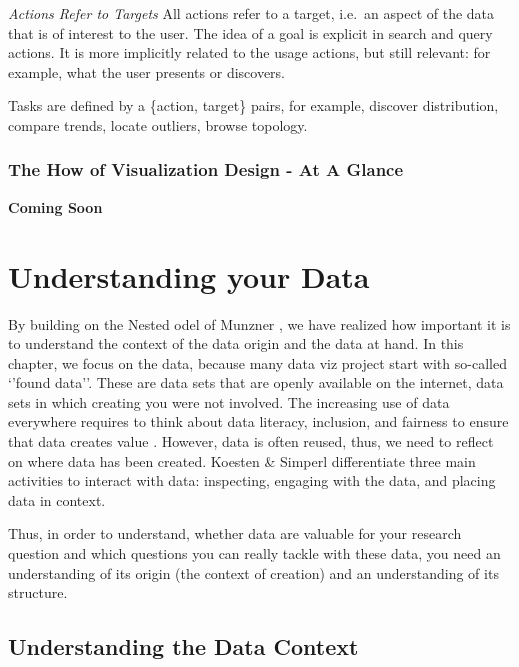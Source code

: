 \documentclass[
]{book}
\begin{document}
\emph{Actions Refer to Targets}
All actions refer to a target, i.e.~an aspect of the data that is of interest to the user. The idea of a goal is explicit in search and query actions. It is more implicitly related to the usage actions, but still relevant: for example, what the user presents or discovers.

Tasks are defined by a \{action, target\} pairs, for example, discover distribution, compare trends, locate outliers, browse topology.

\hypertarget{the-how-of-visualization-design---at-a-glance}{%
\subsection{The How of Visualization Design - At A Glance}\label{the-how-of-visualization-design---at-a-glance}}

\textbf{Coming Soon}

\hypertarget{sec:understandingdata}{%
\chapter{Understanding your Data}\label{sec:understandingdata}}

By building on the Nested odel of Munzner \citep{munzner2014visualization}, we have realized how important it is to understand the context of the data origin and the data at hand. In this chapter, we focus on the data, because many data viz project start with so-called `'found data''. These are data sets that are openly available on the internet, data sets in which creating you were not involved. The increasing use of data everywhere requires to think about data literacy, inclusion, and fairness to ensure that data creates value \citep{KoestenSimperl2021_dataUX}. However, data is often reused, thus, we need to reflect on where data has been created. Koesten \& Simperl \citep{KoestenSimperl2021_dataUX} differentiate three main activities to interact with data: inspecting, engaging with the data, and placing data in context.

Thus, in order to understand, whether data are valuable for your research question and which questions you can really tackle with these data, you need an understanding of its origin (the context of creation) and an understanding of its structure.

\hypertarget{understanding-the-data-context}{%
\section{Understanding the Data Context}\label{understanding-the-data-context}}
\end{document}
